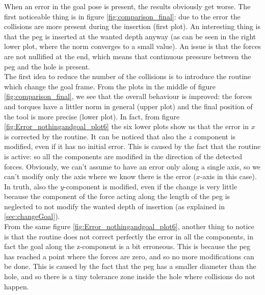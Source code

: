 When an error in the goal pose is present, the results obviously get worse. The first noticeable thing is in figure \ref{fig:comparison_final}: due to the error the collisions are more present during the insertion (first plot). An interesting thing is that the peg is inserted at the wanted depth anyway (as can be seen in the right lower plot, where the norm converges to a small value). An issue is that the forces are not nullified at the end, which means that continuous pressure between the peg and the hole is present.\\
The first idea to reduce the number of the collisions is to introduce the routine which change the goal frame. From the plots in the middle of figure \ref{fig:comparison_final}, we see that the overall behaviour is improved: the forces and torques have a littler norm in general (upper plot) and the final position of the tool is more precise (lower plot). In fact, from figure \ref{fig:Error_nothingandgoal_plot6} the six lower plots show us that the error in $x$ is corrected by the routine. It can be noticed that also the $z$ component is modified, even if it has no initial error. This is caused by the fact that the routine is active: so all the components are modified in the direction of the detected forces. Obviously, we can't assume to have an error only along a single axis, so we can't modify only the axis where we know there is the error ($x$-axis in this case). In truth, also the \mbox{$y$-component} is modified, even if the change is very little because the component of the force acting along the length of the peg is neglected to not modify the wanted depth of insertion (as explained in \ref{sec:changeGoal}).\\
From the same figure \ref{fig:Error_nothingandgoal_plot6}, another thing to notice is that the routine does not correct perfectly the error in all the components, in fact the goal along the z-component is a bit erroneous. This is because the peg has reached a point where the forces are zero, and so no more modifications can be done. This is caused by the fact that the peg has a smaller diameter than the hole, and so there is a tiny tolerance zone inside the hole where collisions do not happen.\\


